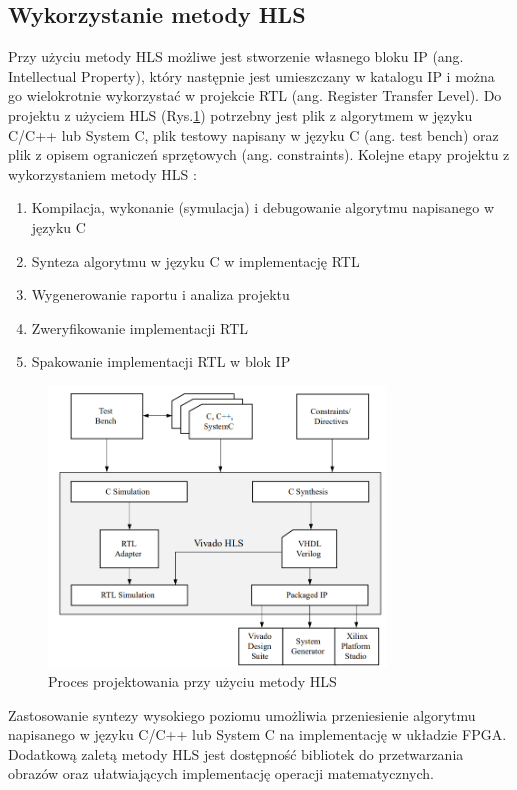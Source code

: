 \subsection{Wykorzystanie metody HLS}
Przy użyciu metody HLS możliwe jest stworzenie własnego bloku IP (ang. 
Intellectual Property), który następnie jest umieszczany w katalogu IP i można 
go wielokrotnie wykorzystać w projekcie RTL (ang. Register Transfer Level).
Do projektu z użyciem HLS (Rys.\ref{hls_design_flow}) potrzebny jest plik 
z algorytmem w języku C/C++ lub System C, plik testowy napisany w języku C 
(ang. test bench) oraz plik z opisem ograniczeń sprzętowych (ang. constraints).
Kolejne etapy projektu z wykorzystaniem metody HLS \cite{hlsXilinxGuide}:

\begin{enumerate}
    \item Kompilacja, wykonanie (symulacja) i debugowanie algorytmu napisanego w języku C
    \item Synteza algorytmu w języku C w implementację RTL
    \item Wygenerowanie raportu i analiza projektu
    \item Zweryfikowanie implementacji RTL
    \item Spakowanie implementacji RTL w blok IP
\end{enumerate}


\begin{figure}
  \centering
  \includegraphics[width=0.8\textwidth]{img/hls_design_flow.png}
  \caption{Proces projektowania przy użyciu metody HLS}
  \label{hls_design_flow}
\end{figure}

Zastosowanie syntezy wysokiego poziomu umożliwia przeniesienie algorytmu 
napisanego w języku C/C++ lub System C na implementację w układzie FPGA. 
Dodatkową zaletą metody HLS jest dostępność bibliotek do przetwarzania 
obrazów oraz ułatwiających implementację operacji matematycznych. 

